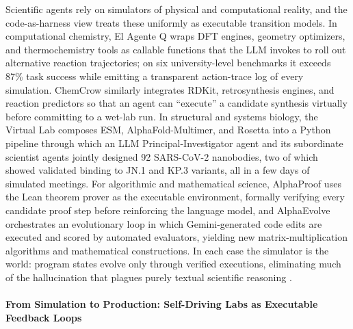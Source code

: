 Scientific agents rely on simulators of physical and computational reality, and the code-as-harness view treats these uniformly as executable transition models. In computational chemistry, El Agente Q \citep{Zou_2025} wraps DFT engines, geometry optimizers, and thermochemistry tools as callable functions that the LLM invokes to roll out alternative reaction trajectories; on six university-level benchmarks it exceeds 87\% task success while emitting a transparent action-trace log of every simulation. ChemCrow \citep{bran2023chemcrowaugmentinglargelanguagemodels} similarly integrates RDKit, retrosynthesis engines, and reaction predictors so that an agent can ``execute'' a candidate synthesis virtually before committing to a wet-lab run. In structural and systems biology, the Virtual Lab \citep{swanson2025virtual} composes ESM, AlphaFold-Multimer, and Rosetta into a Python pipeline through which an LLM Principal-Investigator agent and its subordinate scientist agents jointly designed 92 SARS-CoV-2 nanobodies, two of which showed validated binding to JN.1 and KP.3 variants,  all in a few days of simulated meetings. For algorithmic and mathematical science, AlphaProof \citep{hubert2025olympiad} uses the Lean theorem prover as the executable environment, formally verifying every candidate proof step before reinforcing the language model, and AlphaEvolve \citep{novikov2025alphaevolvecodingagentscientific} orchestrates an evolutionary loop in which Gemini-generated code edits are executed and scored by automated evaluators, yielding new matrix-multiplication algorithms and mathematical constructions. In each case the simulator is the world: program states evolve only through verified executions, eliminating much of the hallucination that plagues purely textual scientific reasoning \citep{ren2026scientificintelligencesurveyllmbased}.

\paragraph{From Simulation to Production: Self-Driving Labs as Executable Feedback Loops}

